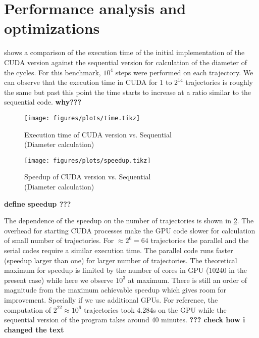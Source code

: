 
\section{Performance analysis and optimizations}

 shows a comparison of the execution time of the initial implementation of the CUDA version against the sequential version for calculation of the diameter of the cycles. For this benchmark, $10^4$ steps were performed on each trajectory. We can observe that the execution time
in CUDA for 1 to $2^{14}$ trajectories is roughly the same but past this point the time starts to increase at a ratio similar to the sequential code.
{\bf why???}


\begin{figure}[H]
    \centering
    \texttt{[image: figures/plots/time.tikz]}
    \caption{Execution time of CUDA version vs. Sequential \\ (Diameter
    calculation)}%
    \label{fig:time_cuda}
\end{figure}

\begin{figure}[H]
    \centering
    \texttt{[image: figures/plots/speedup.tikz]}
    \caption{Speedup of CUDA version vs. Sequential \\ (Diameter
    calculation)}%
    \label{fig:speedup}
\end{figure}

{\bf define speedup ???}

The dependence of the speedup on the number of trajectories is shown in \cref{fig:speedup}. 
The overhead for starting CUDA processes make the GPU code slower for calculation of small number of trajectories. For $\approx 2^6 =64$ trajectories the parallel and the serial codes require a similar execution time. The parallel code runs faster (speedup larger than one) for larger number of trajectories. The theoretical maximum for speedup is limited by the number of cores in GPU (10240 in the present case) while here we observe $10^3$ at maximum. There is still an order of magnitude from the maximum achievable speedup which gives room for improvement. Specially if we use additional GPUs. For reference, the computation of $2^{22} \approx 10^6$ trajectories took 4.284s on the GPU while the sequential version of the program takes around 40 minutes.
{\bf ??? check how i changed the text}